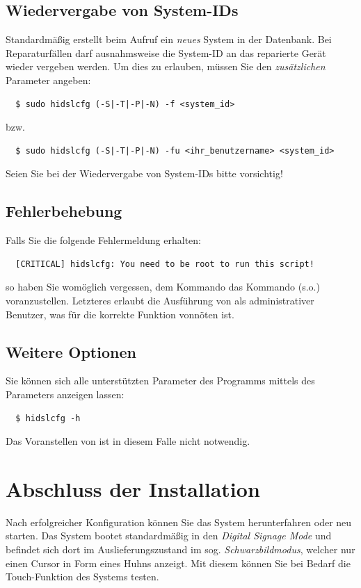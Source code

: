 \documentclass[a4paper,11pt,authoryear]{article}
\begin{document}
\subsection{Wiedervergabe von System-IDs}
Standardmäßig erstellt  beim Aufruf ein \emph{neues} System in der Datenbank.
Bei Reparaturfällen darf ausnahmsweise die System-ID an das reparierte Gerät wieder vergeben werden.
Um dies zu erlauben, müssen Sie den \emph{zusätzlichen} Parameter  angeben:
\begin{verbatim}
  $ sudo hidslcfg (-S|-T|-P|-N) -f <system_id>
\end{verbatim}
bzw.
\begin{verbatim}
  $ sudo hidslcfg (-S|-T|-P|-N) -fu <ihr_benutzername> <system_id>
\end{verbatim}
Seien Sie bei der Wiedervergabe von System-IDs bitte vorsichtig!

\subsection{Fehlerbehebung}
Falls Sie die folgende Fehlermeldung erhalten:
\begin{verbatim}
  [CRITICAL] hidslcfg: You need to be root to run this script!
\end{verbatim}
so haben Sie womöglich vergessen, dem Kommando  das Kommando  (s.o.) voranzustellen.
Letzteres erlaubt die Ausführung von  als administrativer Benutzer, was für die korrekte Funktion vonnöten ist.
\subsection{Weitere Optionen}
Sie können sich alle unterstützten Parameter des Programms  mittels des Parameters  anzeigen lassen:
\begin{verbatim}
  $ hidslcfg -h
\end{verbatim}
Das Voranstellen von  ist in diesem Falle nicht notwendig.

\section{Abschluss der Installation}
Nach erfolgreicher Konfiguration können Sie das System herunterfahren oder neu starten.
Das System bootet standardmäßig in den \emph{Digital Signage Mode} und befindet sich dort im Auslieferungszustand im sog. \emph{Schwarzbildmodus}, welcher nur einen Cursor in Form eines Huhns anzeigt.
Mit diesem können Sie bei Bedarf die Touch-Funktion des Systems testen.
\end{document}
